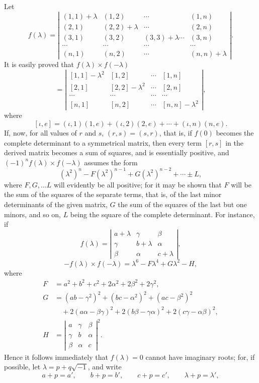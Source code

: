 \documentclass[11pt]{article}
\newcommand{\sourcepage}[1]{\marginpar{\scriptsize p.~#1}}
\begin{document}
{{\sourcepage{379}
Let
\[
f(\lambda)=
\left|\begin{array}{cccc}
(1,1)+\lambda&(1,2)&\cdots&(1,n)\\
(2,1)&(2,2)+\lambda&\cdots&(2,n)\\
(3,1)&(3,2)&(3,3)+\lambda\cdots&(3,n)\\
\cdots&\cdots&\cdots&\cdots\\
(n,1)&(n,2)&\cdots&(n,n)+\lambda
\end{array}\right|.
\]
It is easily proved that $f(\lambda)\times f(-\lambda)$
\[
=
\left|\begin{array}{cccc}
[1,1]-\lambda^2&[1,2]&\cdots&[1,n]\\
{}[2,1]&[2,2]-\lambda^2&\cdots&[2,n]\\
\cdots&\cdots&\cdots&\cdots\\
{}[n,1]&[n,2]&\cdots&[n,n]-\lambda^2
\end{array}\right|,
\]
where
\[
[\iota,e]=(\iota,1)(1,e)+(\iota,2)(2,e)+\cdots+(\iota,n)(n,e).
\]
If, now, for all values of $r$ and $s$, $(r,s)=(s,r)$, that is, if $f(0)$ becomes the complete determinant to a symmetrical matrix, then every term $[r,s]$ in the derived matrix becomes a sum of squares, and is essentially positive, and $(-1)^n f(\lambda)\times f(-\lambda)$ assumes the form
\[
(\lambda^2)^n-F(\lambda^2)^{n-1}+G(\lambda^2)^{n-2}+\cdots\pm L,
\]
where $F,G,\ldots L$ will evidently be all positive; for it may be shown that $F$ will be the sum of the squares of the separate terms, that is, of the last minor determinants of the given matrix, $G$ the sum of the squares of the last but one minors, and so on, $L$ being the square of the complete determinant. For instance, if
\[
f(\lambda)=
\left|\begin{array}{ccc}
a+\lambda&\gamma&\beta\\
\gamma&b+\lambda&\alpha\\
\beta&\alpha&c+\lambda
\end{array}\right|,
\]
\[
-f(\lambda)\times f(-\lambda)=\lambda^6-F\lambda^4+G\lambda^2-H,
\]
where
\[
\begin{aligned}
F&=a^2+b^2+c^2+2\alpha^2+2\beta^2+2\gamma^2,\\
G&=(ab-\gamma^2)^2+(bc-\alpha^2)^2+(ac-\beta^2)^2\\
&\quad +2(a\alpha-\beta\gamma)^2+2(b\beta-\gamma\alpha)^2+2(c\gamma-\alpha\beta)^2,\\
H&=\left|\begin{array}{ccc}
a&\gamma&\beta\\
\gamma&b&\alpha\\
\beta&\alpha&c
\end{array}\right|^2.
\end{aligned}
\]
Hence it follows immediately that $f(\lambda)=0$ cannot have imaginary roots; for, if possible, let $\lambda=p+q\sqrt{-1}$, and write
\[
a+p=a',\qquad b+p=b',\qquad c+p=c',\qquad \lambda+p=\lambda',
\]

}}
\end{document}
